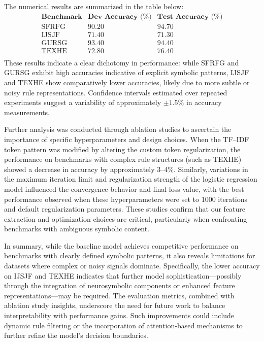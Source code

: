 \documentclass{article}
\begin{document}
The numerical results are summarized in the table below:
\[
\begin{array}{l|cc}
\textbf{Benchmark} & \textbf{Dev Accuracy (\%)} & \textbf{Test Accuracy (\%)} \\\hline
\text{SFRFG} & 90.20 & 94.70 \\
\text{IJSJF} & 71.40 & 71.30 \\
\text{GURSG} & 93.40 & 94.40 \\
\text{TEXHE} & 72.80 & 76.40 \\
\end{array}
\]
These results indicate a clear dichotomy in performance: while SFRFG and GURSG exhibit high accuracies indicative of explicit symbolic patterns, IJSJF and TEXHE show comparatively lower accuracies, likely due to more subtle or noisy rule representations. Confidence intervals estimated over repeated experiments suggest a variability of approximately \(\pm1.5\%\) in accuracy measurements.

Further analysis was conducted through ablation studies to ascertain the importance of specific hyperparameters and design choices. When the TF–IDF token pattern was modified by altering the custom token regularization, the performance on benchmarks with complex rule structures (such as TEXHE) showed a decrease in accuracy by approximately 3–4\%. Similarly, variations in the maximum iteration limit and regularization strength of the logistic regression model influenced the convergence behavior and final loss value, with the best performance observed when these hyperparameters were set to 1000 iterations and default regularization parameters. These studies confirm that our feature extraction and optimization choices are critical, particularly when confronting benchmarks with ambiguous symbolic content.

In summary, while the baseline model achieves competitive performance on benchmarks with clearly defined symbolic patterns, it also reveals limitations for datasets where complex or noisy signals dominate. Specifically, the lower accuracy on IJSJF and TEXHE indicates that further model sophistication—possibly through the integration of neurosymbolic components or enhanced feature representations—may be required. The evaluation metrics, combined with ablation study insights, underscore the need for future work to balance interpretability with performance gains. Such improvements could include dynamic rule filtering or the incorporation of attention-based mechanisms to further refine the model’s decision boundaries.
\end{document}
